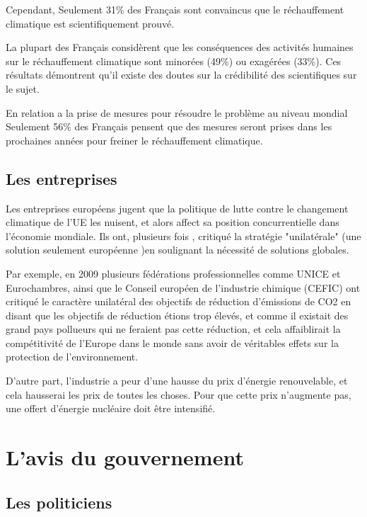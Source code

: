 \documentclass[a4paper,11pt]{article}
\begin{document}
Cependant, Seulement 31\% des Français sont convaincus que le réchauffement climatique est
scientifiquement prouvé.


La plupart des Français considèrent  que les conséquences des activités humaines
sur le réchauffement climatique sont minorées (49\%) ou exagérées (33\%). Ces résultats
démontrent qu'il existe des doutes sur la crédibilité des scientifiques sur le
sujet. 


En relation a la prise de mesures pour résoudre le problème au niveau mondial 
Seulement 56\% des Français pensent que des mesures seront
prises dans  les prochaines années  pour freiner le réchauffement  climatique.

\subsection{Les entreprises}

Les entreprises européens jugent que la politique  de  lutte  contre  le
changement climatique de l'UE les nuisent, et alors affect sa position concurrentielle dans l'économie
mondiale. Ils  ont, plusieurs  fois , critiqué  la stratégie  "unilatérale" (une
solution seulement européenne )en
soulignant la nécessité de solutions globales.

Par  exemple, en  2009  plusieurs fédérations  professionnelles  comme UNICE  et
Eurochambres, ainsi que le Conseil  européen de l'industrie chimique (CEFIC) ont
critiqué le caractère  unilatéral des objectifs de réduction  d'émissions de CO2
en  disant que  les  objectifs de  réduction  étions trop  élevés,  et comme  il
existait des grand  pays pollueurs qui ne feraient pas  cette réduction, et cela
affaiblirait la compétitivité de l'Europe dans le monde sans avoir de véritables effets sur la
protection de l'environnement.

D'autre part, l'industrie a peur d'une hausse du prix d'énergie renouvelable, et
cela hausserai  les prix de  toutes les choses.  Pour que cette  prix n'augmente
pas, une offert d'énergie nucléaire doit être intensifié.



\section{L’avis du gouvernement}
\subsection{Les politiciens}
\end{document}
